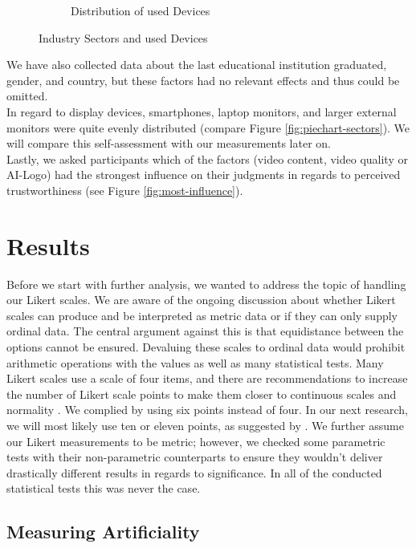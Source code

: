 \documentclass[
  a4paper,  %
  twoside,  %
  bibliography=totoc,
  headsepline,
  cleardoublepage=empty,
  parskip=half,
  draft=false
]{scrbook}
\begin{document}
\begin{figure}[h]
\begin{subfigure}{0.38\textwidth}
    \caption{Distribution of used Devices}
    \label{fig:piechart-devices}
  \end{subfigure}
  \caption{Industry Sectors and used Devices}
\end{figure}

We have also collected data about the last educational institution graduated, gender, and country, but these factors had no relevant effects and thus could be omitted. \\
In regard to display devices, smartphones, laptop monitors, and larger external monitors were quite evenly distributed (compare Figure \ref{fig:piechart-sectors}). We will compare this self-assessment with our measurements later on. \\
Lastly, we asked participants which of the factors (video content, video quality or AI-Logo) had the strongest influence on their judgments in regards to perceived trustworthiness (see Figure \ref{fig:most-influence}).

\section{Results}
\label{sec:results}

Before we start with further analysis, we wanted to address the topic of handling our Likert scales. We are aware of the ongoing discussion about whether Likert scales can produce and be interpreted as metric data or if they can only supply ordinal data. The central argument against this is that equidistance between the options cannot be ensured. Devaluing these scales to ordinal data would prohibit arithmetic operations with the values as well as many statistical tests. Many Likert scales use a scale of four items, and there are recommendations to increase the number of Likert scale points to make them closer to continuous scales and normality \cite{wuCanLikertScales2017a}. We complied by using six points instead of four. In our next research, we will most likely use ten or eleven points, as suggested by . We further assume our Likert measurements to be metric; however, we checked some parametric tests with their non-parametric counterparts to ensure they wouldn't deliver drastically different results in regards to significance. In all of the conducted statistical tests this was never the case.

\subsection{Measuring Artificiality}
\end{document}
